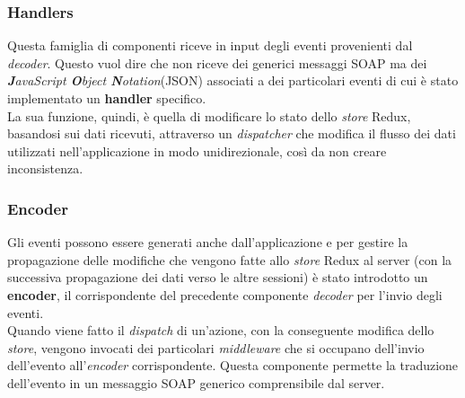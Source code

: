 \subsubsection{Handlers}
Questa famiglia di componenti riceve in input degli eventi provenienti dal \emph{decoder}. Questo vuol dire che non riceve dei generici messaggi SOAP ma dei \emph{\textbf{J}avaScript \textbf{O}bject \textbf{N}otation}(\acrshort{JSON}) associati a dei particolari eventi di cui è stato implementato un \textbf{handler} specifico.\\
La sua funzione, quindi, è quella di modificare lo stato dello \emph{store} Redux, basandosi sui dati ricevuti, attraverso un \emph{dispatcher} che modifica il flusso dei dati utilizzati nell'applicazione in modo unidirezionale, così da non creare inconsistenza.
\subsubsection{Encoder}
Gli eventi possono essere generati anche dall'applicazione e per gestire la propagazione delle modifiche che vengono fatte allo \emph{store} Redux al server (con la successiva propagazione dei dati verso le altre sessioni) è stato introdotto un \textbf{encoder}, il corrispondente del precedente componente \emph{decoder} per l'invio degli eventi. \\
Quando viene fatto il \emph{dispatch} di un'azione, con la conseguente modifica dello \emph{store}, vengono invocati dei particolari \emph{middleware} che si occupano dell'invio dell'evento all'\emph{encoder} corrispondente. Questa componente permette la traduzione dell'evento in un messaggio SOAP generico comprensibile dal server.


